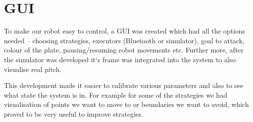 \section{GUI}

To make our robot easy to control, a GUI was created which had all the options needed – choosing strategies, executors (Bluetooth or simulator), goal to attack, colour of the plate, pausing/resuming robot movements etc. Further more, after the simulator was developed it‘s frame was integrated into the system to also visualise real pitch. \linebreak

This development made it easier to calibrate various parameters and also to see what state the system is in. For example for some of the strategies we had visualisation of points we want to move to or boundaries we want to avoid, which proved to be very useful to improve strategies.
